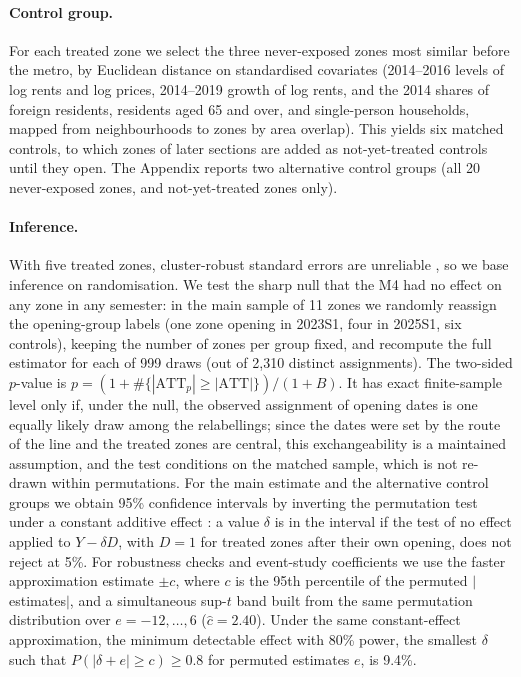 \paragraph{Control group.} For each treated zone we select the three never-exposed zones most similar before the metro, by Euclidean distance on standardised covariates (2014--2016 levels of log rents and log prices, 2014--2019 growth of log rents, and the 2014 shares of foreign residents, residents aged 65 and over, and single-person households, mapped from neighbourhoods to zones by area overlap). This yields six matched controls, to which zones of later sections are added as not-yet-treated controls until they open. The Appendix reports two alternative control groups (all 20 never-exposed zones, and not-yet-treated zones only).

\paragraph{Inference.} With five treated zones, cluster-robust standard errors are unreliable \cite{conley2011,mackinnon2018}, so we base inference on randomisation. We test the sharp null that the M4 had no effect on any zone in any semester: in the main sample of 11 zones we randomly reassign the opening-group labels (one zone opening in 2023S1, four in 2025S1, six controls), keeping the number of zones per group fixed, and recompute the full estimator for each of 999 draws (out of 2,310 distinct assignments). The two-sided $p$-value is $p=(1+\#\{|\mathrm{ATT}_p|\ge|\mathrm{ATT}|\})/(1+B)$. It has exact finite-sample level only if, under the null, the observed assignment of opening dates is one equally likely draw among the relabellings; since the dates were set by the route of the line and the treated zones are central, this exchangeability is a maintained assumption, and the test conditions on the matched sample, which is not re-drawn within permutations. For the main estimate and the alternative control groups we obtain 95\% confidence intervals by inverting the permutation test under a constant additive effect \cite{imbens2015}: a value $\delta$ is in the interval if the test of no effect applied to $Y-\delta D$, with $D=1$ for treated zones after their own opening, does not reject at 5\%. For robustness checks and event-study coefficients we use the faster approximation estimate $\pm c$, where $c$ is the 95th percentile of the permuted $|$estimates$|$, and a simultaneous sup-$t$ band \cite{montielolea2019} built from the same permutation distribution over $e=-12,\dots,6$ ($\hat c=2.40$). Under the same constant-effect approximation, the minimum detectable effect with 80\% power, the smallest $\delta$ such that $P(|\delta+e|\ge c)\ge0.8$ for permuted estimates $e$, is 9.4\%.


